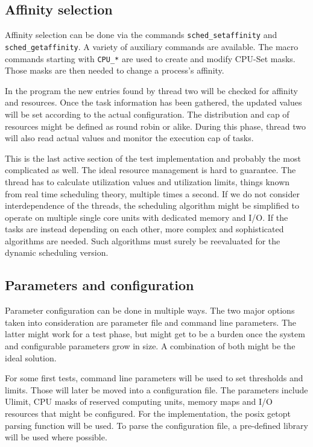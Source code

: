 \documentclass[]{scrartcl}
\begin{document}
\subsection{Affinity selection}

Affinity selection can be done via the commands \texttt{sched\_setaffinity} and \texttt{sched\_getaffinity}.
A variety of auxiliary commands are available. 
The macro commands starting with \texttt{CPU\_*} are used to create and modify CPU-Set masks.
Those masks are then needed to change a process's affinity.

In the program the new entries found by thread two will be checked for affinity and resources.
Once the task information has been gathered, the updated values will be set according to the actual configuration.
The distribution and cap of resources might be defined as round robin or alike.
During this phase, thread two will also read actual values and monitor the execution cap of tasks.

This is the last active section of the test implementation and probably the most complicated as well.
The ideal resource management is hard to guarantee.
The thread has to calculate utilization values and utilization limits, things known from real time scheduling theory, multiple times a second. 
If we do not consider interdependence of the threads, the scheduling algorithm might be simplified to operate on multiple single core units with dedicated memory and I/O.
If the tasks are instead depending on each other, more complex and sophisticated algorithms are needed.
Such algorithms must surely be reevaluated for the dynamic scheduling version.

\subsection{Parameters and configuration}

Parameter configuration can be done in multiple ways. The two major options taken into consideration are parameter file and command line parameters.
The latter might work for a test phase, but might get to be a burden once the system and configurable parameters grow in size.
A combination of both might be the ideal solution.

For some first tests, command line parameters will be used to set thresholds and limits. Those will later be moved into a configuration file.
The parameters include Ulimit, CPU masks of reserved computing units, memory maps and I/O resources that might be configured. 
For the implementation, the posix getopt parsing function will be used.
To parse the configuration file, a pre-defined library will be used where possible.
\end{document}
